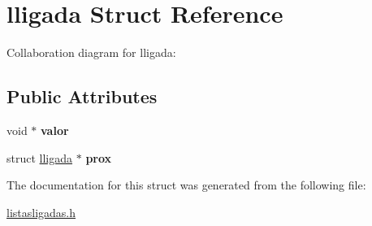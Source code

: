\hypertarget{structlligada}{}\section{lligada Struct Reference}
\label{structlligada}


Collaboration diagram for lligada\+:
\subsection*{Public Attributes}
\begin{DoxyCompactItemize}
\item 
\mbox{\label{structlligada_a64449f0259fb452865ae4989609b7af8}} 
void $\ast$ {\bfseries valor}
\item 
\mbox{\label{structlligada_ae620cb307892f22905d79e0d5013f9e3}} 
struct \hyperlink{structlligada}{lligada} $\ast$ {\bfseries prox}
\end{DoxyCompactItemize}


The documentation for this struct was generated from the following file\+:\begin{DoxyCompactItemize}
\item 
\hyperlink{listasligadas_8h}{listasligadas.\+h}\end{DoxyCompactItemize}
